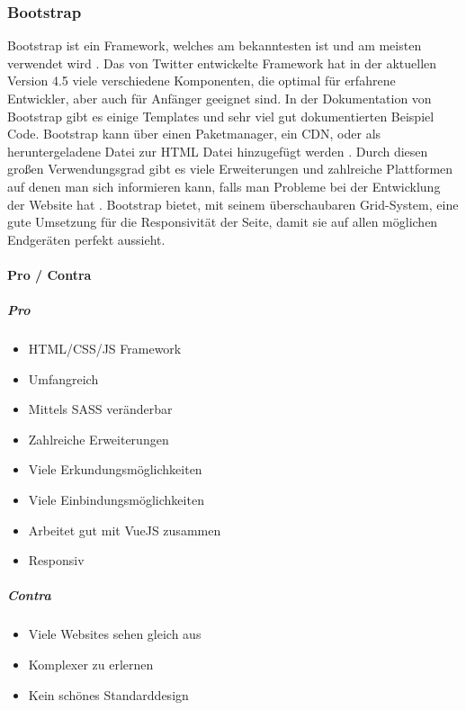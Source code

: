 		\subsubsection{Bootstrap}
		\label{chapter:study-frontend-frameworks-bootstrap}
		Bootstrap ist ein Framework, welches am bekanntesten ist und am meisten verwendet wird \cite{introduction-bootstrap, learning-bootstrap}. Das von Twitter entwickelte Framework hat in der aktuellen Version 4.5 viele verschiedene Komponenten, die optimal für erfahrene Entwickler, aber auch für Anfänger geeignet sind. In der Dokumentation von Bootstrap gibt es einige Templates und sehr viel gut dokumentierten Beispiel Code\cite{introduction-bootstrap}. Bootstrap kann über einen Paketmanager, ein CDN, oder als heruntergeladene Datei zur HTML Datei hinzugefügt werden \cite{bootstrap-docu}. Durch diesen großen Verwendungsgrad gibt es viele Erweiterungen und zahlreiche Plattformen auf denen man sich informieren kann, falls man Probleme bei der Entwicklung der Website hat \cite{learning-bootstrap}. Bootstrap bietet, mit seinem überschaubaren Grid-System, eine gute Umsetzung für die Responsivität der Seite, damit sie auf allen möglichen Endgeräten perfekt aussieht.
		\paragraph{Pro / Contra}
		\subparagraph{Pro}
		\begin{itemize}
			\item HTML/CSS/JS Framework
			\item Umfangreich
			\item Mittels SASS veränderbar
			\item Zahlreiche Erweiterungen
			\item Viele Erkundungsmöglichkeiten
			\item Viele Einbindungsmöglichkeiten
			\item Arbeitet gut mit VueJS zusammen
			\item Responsiv
		\end{itemize}
	\label{list:bootstrappro}
		\subparagraph{Contra}
		\begin{itemize}
			\item Viele Websites sehen gleich aus
			\item Komplexer zu erlernen
			\item Kein schönes Standarddesign
		\end{itemize}
	\label{list:bootstrapcontra}
	
